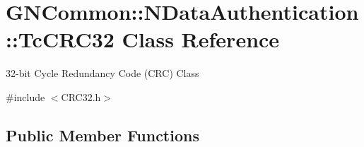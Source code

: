 \hypertarget{class_g_n_common_1_1_n_data_authentication_1_1_tc_c_r_c32}{}\section{G\+N\+Common\+:\+:N\+Data\+Authentication\+:\+:Tc\+C\+R\+C32 Class Reference}
\label{class_g_n_common_1_1_n_data_authentication_1_1_tc_c_r_c32}


32-\/bit Cycle Redundancy Code (C\+RC) Class  




{\ttfamily \#include $<$C\+R\+C32.\+h$>$}

\subsection*{Public Member Functions}
